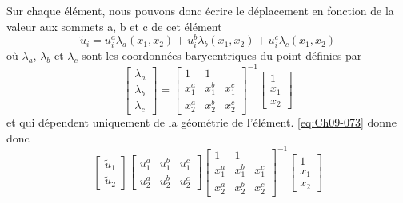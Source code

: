 Sur chaque élément, nous pouvons donc écrire le déplacement en fonction de la valeur aux sommets a, b et c de cet élément 
\begin{equation}
    \tilde{u}_i = u_i^a \lambda_a \left( x_1, x_2 \right) + u_i^b \lambda_b \left( x_1, x_2 \right) + u_i^c \lambda_c \left( x_1, x_2 \right)
    \label{eq:Ch09-073}
\end{equation}
où $\lambda_a$, $\lambda_b$ et $\lambda_c$ sont les coordonnées barycentriques du point définies par 
\begin{equation}
    \begin{bmatrix}
        \lambda_a\\
        \lambda_b\\
        \lambda_c
    \end{bmatrix}
    =
    \begin{bmatrix}
        1 & 1 & \\
        x_1^a & x_1^b & x_1^c \\
        x_2^a & x_2^b & x_2^c
    \end{bmatrix}^{-1}
    \begin{bmatrix}
        1 \\
        x_1 \\
        x_2
    \end{bmatrix}
    \label{eq:Ch09-074}
\end{equation}
et qui dépendent uniquement de la géométrie de l'élément.
\eqref{eq:Ch09-073} donne donc
\begin{equation}
    \begin{bmatrix}
        \tilde{u}_1 \\
        \tilde{u}_2
    \end{bmatrix}
    \begin{bmatrix}
        u_1^a & u_1^b & u_1^c \\
        u_2^a & u_2^b & u_2^c
    \end{bmatrix}
    \begin{bmatrix}
        1 & 1 & \\
        x_1^a & x_1^b & x_1^c \\
        x_2^a & x_2^b & x_2^c
    \end{bmatrix}^{-1}
    \begin{bmatrix}
        1 \\
        x_1 \\
        x_2
    \end{bmatrix}
    \label{eq:Ch09-075}
\end{equation}
